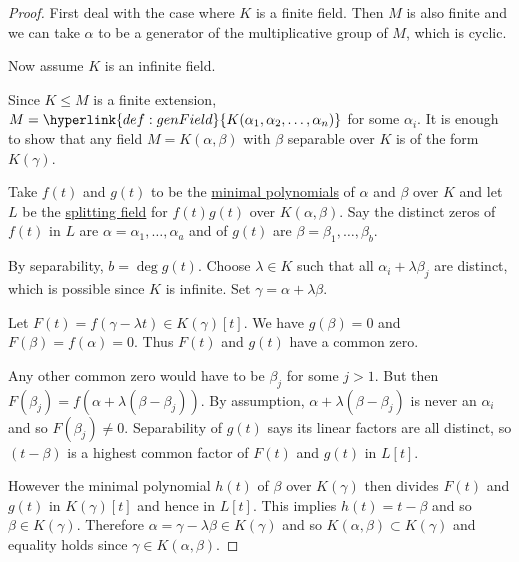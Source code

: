\documentclass{article}
\begin{document}
\begin{proof}
    First deal with the case where $K$ is a finite field. Then $M$ is also finite and we can take $\alpha$ to be a generator of the multiplicative group of $M$, which is cyclic.

    Now assume $K$ is an infinite field.

    Since $K\leq M$ is a finite extension, $M = \hyperlink{def:genField}{K(\alpha_1, \alpha_2, \dotsc, \alpha_n)}$ for some $\alpha_i$.
    It is enough to show that any field $M = K(\alpha, \beta)$ with $\beta$ separable over $K$ is of the form $K(\gamma)$.

    Take $f(t)$ and $g(t)$ to be the \hyperlink{def:minimalPoly}{minimal polynomials} of $\alpha$ and $\beta$ over $K$ and let $L$ be the \hyperlink{def:splitting}{splitting field} for $f(t) g(t)$ over $K(\alpha, \beta)$.
    Say the distinct zeros of $f(t)$ in $L$ are $\alpha = \alpha_1, \dotsc, \alpha_a$ and of $g(t)$ are $\beta = \beta_1, \dotsc, \beta_b$.

    By separability, $b = \deg g(t)$.
    Choose $\lambda \in K$ such that all $\alpha_i + \lambda \beta_j$ are distinct, which is possible since $K$ is infinite.
    Set $\gamma = \alpha + \lambda \beta$.

    Let $F(t) = f(\gamma - \lambda t) \in K(\gamma)[t]$. We have $g(\beta) = 0$ and $F(\beta) = f(\alpha) = 0$. Thus $F(t)$ and $g(t)$ have a common zero.

    Any other common zero would have to be $\beta_j$ for some $j > 1$. But then $F(\beta_j) = f(\alpha + \lambda(\beta - \beta_j))$.
    By assumption, $\alpha + \lambda(\beta - \beta_j)$ is never an $\alpha_i$ and so $F(\beta_j) \neq 0$.
    Separability of $g(t)$ says its linear factors are all distinct, so $(t-\beta)$ is a highest common factor of $F(t)$ and $g(t)$ in $L[t]$.

    However the minimal polynomial $h(t)$ of $\beta$ over $K(\gamma)$ then divides $F(t)$ and $g(t)$ in $K(\gamma)[t]$ and hence in $L[t]$. This implies $h(t) = t - \beta$ and so $\beta \in K(\gamma)$.
    Therefore $\alpha = \gamma - \lambda \beta \in K(\gamma)$ and so $K(\alpha, \beta) \subset K(\gamma)$ and equality holds since $\gamma \in K(\alpha, \beta)$.
\end{proof}
\end{document}

